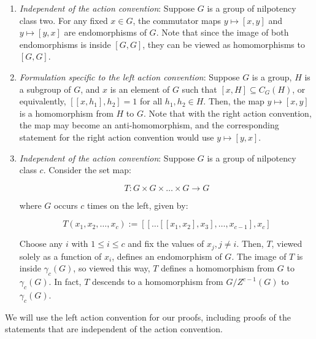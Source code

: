 \begin{lemma}\label{lemma:iterated-commutator-is-multilinear}
  \begin{enumerate}
  \item {\em Independent of the action convention}: Suppose $G$ is a
    group of nilpotency class two. For any fixed $x \in G$, the
    commutator maps $y \mapsto [x,y]$ and $y \mapsto [y,x]$ are
    endomorphisms of $G$. Note that since the image of both
    endomorphisms is inside $[G,G]$, they can be viewed as
    homomorphisms to $[G,G]$.
  \item {\em Formulation specific to the left action convention}:
    Suppose $G$ is a group, $H$ is a subgroup of $G$, and $x$ is an
    element of $G$ such that $[x,H] \subseteq C_G(H)$, or
    equivalently, $[[x,h_1],h_2] = 1$ for all $h_1, h_2 \in H$. Then,
    the map $y \mapsto [x,y]$ is a homomorphism from $H$ to $G$. Note
    that with the right action convention, the map may become an
    anti-homomorphism, and the corresponding statement for the right
    action convention would use $y \mapsto [y,x]$.
  \item {\em Independent of the action convention}: Suppose $G$ is a
    group of nilpotency class $c$. Consider the set map:

    $$T: G \times G \times \dots \times G \to G$$

    where $G$ occurs $c$ times on the left, given by:

    $$T(x_1,x_2,\dots,x_c) := [[ \dots [[x_1,x_2],x_3],\dots,x_{c-1}],x_c]$$

    Choose any $i$ with $1 \le i \le c$ and fix the values of $x_j, j
    \ne i$. Then, $T$, viewed solely as a function of $x_i$, defines
    an endomorphism of $G$. The image of $T$ is inside $\gamma_c(G)$,
    so viewed this way, $T$ defines a homomorphism from $G$ to
    $\gamma_c(G)$. In fact, $T$ descends to a homomorphism from
    $G/Z^{c-1}(G)$ to $\gamma_c(G)$.
  \end{enumerate}
\end{lemma}

We will use the left action convention for our proofs, including
proofs of the statements that are independent of the action
convention.

